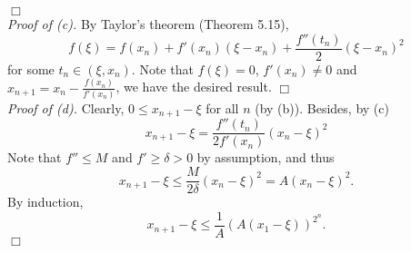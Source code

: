 \documentclass{article}
\begin{document}
$\Box$ \\



\emph{Proof of (c).}
By Taylor's theorem (Theorem 5.15),
\[
        f(\xi) = f(x_n) + f'(x_n)(\xi - x_n) + \frac{f''(t_n)}{2}(\xi - x_n)^2
\]
for some $t_n \in (\xi, x_n)$.
Note that $f(\xi) = 0$, $f'(x_n) \neq 0$ and $x_{n+1} = x_n - \frac{f(x_n)}{f'(x_n)}$,
we have the desired result.
$\Box$ \\



\emph{Proof of (d).}
Clearly, $0 \leq x_{n+1} - \xi$ for all $n$ (by (b)).
Besides, by (c)
\[
  x_{n+1} - \xi = \frac{f''(t_n)}{2 f'(x_n)} (x_n-\xi)^2
\]
Note that $f'' \leq M$ and $f' \geq \delta > 0$ by assumption, and thus
\[
  x_{n+1} - \xi
  \leq \frac{M}{2\delta} (x_n - \xi)^2 = A (x_n - \xi)^2.
\]
By induction,
\[
  x_{n+1} - \xi \leq \frac{1}{A}(A(x_1-\xi))^{2^n}.
\]
$\Box$ \\
\end{document}
